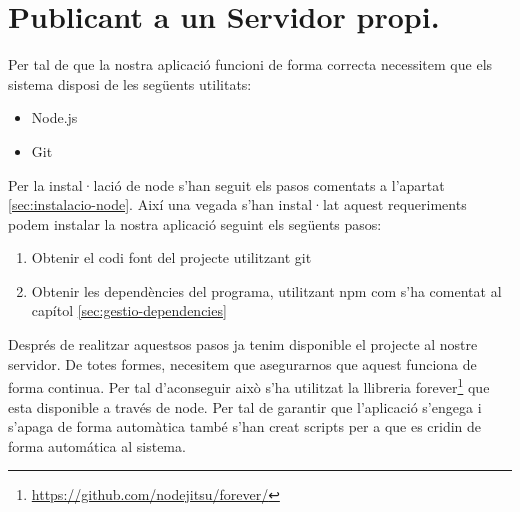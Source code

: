 \section{Publicant a un Servidor propi.}

Per tal de que la nostra aplicació funcioni de forma correcta necessitem que els sistema disposi de les següents utilitats:

\begin{itemize}
\item{Node.js}
\item{Git}
\end{itemize}

Per la instal·lació de node s'han seguit els pasos comentats a l'apartat \ref{sec:instalacio-node}. Així una vegada s'han instal·lat aquest requeriments podem instalar la nostra aplicació seguint els següents pasos: 

\begin{enumerate}
\item{Obtenir el codi font del projecte utilitzant git}
\item{Obtenir les dependències del programa, utilitzant npm com s'ha comentat al capítol \ref{sec:gestio-dependencies}}
\end{enumerate}

Després de realitzar aquestsos pasos ja tenim disponible el projecte al nostre servidor. De totes formes, necesitem que asegurarnos que aquest funciona de forma continua. Per tal d'aconseguir això s'ha utilitzat la llibreria forever\footnote{\url{https://github.com/nodejitsu/forever/}} que esta disponible a través de node. Per tal de garantir que l'aplicació s'engega i s'apaga de forma automàtica també s'han creat scripts per a que es cridin de forma automática al sistema. 

